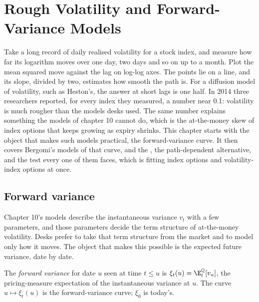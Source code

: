 \chapter{Rough Volatility and Forward-Variance Models}\label{ch:dv:rough-volatility-and-forward-variance-models}

Take a long record of daily realised volatility for a stock index, and measure how far its logarithm moves
over one day, two days and so on up to a month. Plot the mean squared move against the lag on log-log axes.
The points lie on a line, and its slope, divided by two, estimates how smooth the path is. For a diffusion
model of volatility, such as Heston's, the answer at short lags is one half. In 2014 three researchers
reported, for every index they measured, a number near 0.1: volatility is much rougher than the models
desks used. The same number explains something the models of chapter 10 cannot do, which is the at-the-money
skew of index options that keeps growing as expiry shrinks. This chapter starts with the object that makes
such models practical, the forward-variance curve. It then covers Bergomi's models of that curve,  and the , the path-dependent alternative, and the test every one of them
faces, which is fitting index options and volatility-index options at once.

\section{Forward variance}

Chapter 10's models describe the instantaneous variance $v_t$ with a few parameters, and those parameters
decide the term structure of at-the-money volatility. Desks prefer to take that term structure from the
market and to model only how it moves. The object that makes this possible is the expected future
variance, date by date.

\begin{definition}\label{def:dv:rough-volatility-and-forward-variance-models:fwdvar}
The \emph{forward variance} for date $u$ seen at time $t\le u$ is
$\xi_t(u)=\E^{\mathbb Q}_t[v_u]$, the pricing-measure expectation of the instantaneous variance at $u$. The
curve $u\mapsto\xi_t(u)$ is the forward-variance curve; $\xi_0$ is today's.
\end{definition}

